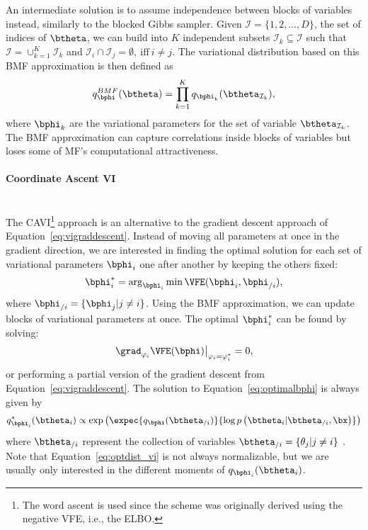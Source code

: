 An intermediate solution is to assume independence between blocks of variables instead, similarly to the blocked Gibbs sampler.
Given $\mathcal{I}=\{1,2,\ldots,D\}$, the set of indices of $\btheta$, we can build into $K$ independent subsets $\mathcal{I}_k \subseteq \mathcal{I}$ such that  $\mathcal{I} = \cup_{k=1}^K \mathcal{I}_{k}$ and $\mathcal{I}_i \cap \mathcal{I}_j=\emptyset,~\mathrm{iff}~i \neq j$.
The variational distribution based on this \ac{BMF} approximation is then defined as
\begin{align}
    q^{BMF}_{\bphi}(\btheta) = \prod_{k=1}^K q_{\bphi_k}(\btheta_{\mathcal{I}_k}),
\end{align}
where $\bphi_k$ are the variational parameters for the set of variable $\btheta_{\mathcal{I}_k}$.
The \ac{BMF} approximation can capture correlations inside blocks of variables but loses some of \ac{MF}'s computational attractiveness.

\paragraph{Coordinate Ascent VI}\mbox{}\\
\label{sec:cavi}
The \ac{CAVI}\footnote{The word ascent is used since the scheme was originally derived using the negative \ac{VFE}, i.e., the \ac{ELBO}.} approach is an alternative to the gradient descent approach of Equation~\eqref{eq:vigraddescent}.
Instead of moving all parameters at once in the gradient direction, we are interested in finding the optimal solution for each set of variational parameters $\bphi_i$ one after another by keeping the others fixed:
\begin{align}
    \bphi_i^* = \arg_{\bphi_i}\min \VFE(\bphi_i, \bphi_{/i}),
    \label{eq:optimalbphi}
\end{align}
where $\bphi_{/i} = \{\bphi_j | j \neq i\}$.
Using the \ac{BMF} approximation, we can update blocks of variational parameters at once.
The optimal $\bphi_i^*$ can be found by solving:
\begin{align}
\left.\grad_{\varphi_i}\VFE(\bphi)\right\vert_{\varphi_i=\varphi_i^*} = 0,
\end{align}
or performing a partial version of the gradient descent from Equation~\eqref{eq:vigraddescent}.
The solution to Equation~\eqref{eq:optimalbphi} is always given by
\begin{align}
q_{\bphi_i}^*(\btheta_i) \propto \exp\left(\expec{q_{\bphi}(\btheta_{/i})}{\log p\left(\btheta_i|\btheta_{/i},\bx\right)}\right)\label{eq:optdist_vi}
\end{align}
where $\btheta_{/i}$ represent the collection of variables $\btheta_{/i} = \{\theta_j | j \neq i\}$ \cite{murphyMachineLearningProbabilistic2012}.
Note that Equation~\eqref{eq:optdist_vi} is not always normalizable, but we are usually only interested in the different moments of $q_{\bphi_i}(\btheta_i)$.

